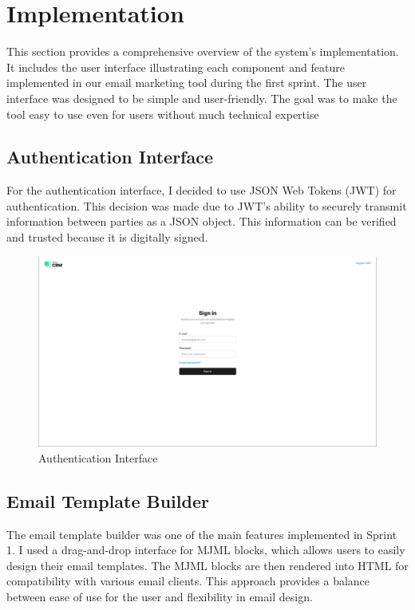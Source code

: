 \section{Implementation}
This section provides a comprehensive overview of the system's implementation. It includes the user interface illustrating each component and feature implemented in our email marketing tool during the first sprint. The user interface was designed to be simple and user-friendly. The goal was to make the tool easy to use even for users without much technical expertise

\subsection{Authentication Interface}

For the authentication interface, I decided to use JSON Web Tokens (JWT) for authentication. This decision was made due to JWT’s ability to securely transmit information between parties as a JSON object. This information can be verified and trusted because it is digitally signed.

\begin{figure}[ht]
	\centering
	\includegraphics[width=0.9\linewidth]{Images/Sprint1/screenshots/Screenshot 2024-05-26 214007.png}
	\caption{Authentication Interface}
	\label{fig:Authentication Interface}
\end{figure}

\subsection{Email Template Builder}

The email template builder was one of the main features implemented in Sprint 1. I used a drag-and-drop interface for MJML blocks, which allows users to easily design their email templates. The MJML blocks are then rendered into HTML for compatibility with various email clients. This approach provides a balance between ease of use for the user and flexibility in email design.

